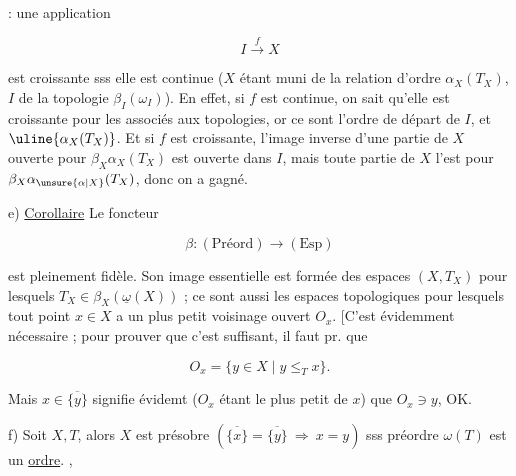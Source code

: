 : une application

\[
I\xrightarrow{f}X
\]

est croissante sss elle est continue (\unsure{$[$}$X$ étant muni de la
relation d'ordre $\alpha_X(T_X)$, $I$ de la topologie $\beta_I(\omega_I)$).
En effet, si $f$ est continue, on sait qu'elle est croissante pour les
 associés aux topologies, or ce sont l'ordre de départ de $I$, et $\uline{\alpha_X(T_X)}$.
Et si $f$ est croissante,  l'image inverse d'une partie de $X$
ouverte pour $\beta_X\alpha_X(T_X)$ est ouverte dans $I$, mais toute partie
 de $X$  l'est pour $\beta_X\alpha_{\unsure{\alpha|X}}(T_X)$, donc on a gagné.

e) \uline{Corollaire} Le foncteur

\[
\beta:(\mathrm{Préord})\longrightarrow(\mathrm{Esp})
\]

est pleinement fidèle. Son image essentielle est formée des
espaces $(X,T_X)$ pour lesquels $T_X\in\beta_X(\underline\omega(X))$ ; ce sont aussi
les espaces topologiques pour lesquels tout point $x\in X$ a un
plus petit voisinage ouvert $O_x$. [C'est évidemment nécessaire ;
 pour prouver que c'est suffisant, il faut pr. que

\[
O_x=\{y\in X\mid y\leq_T x\}.
\]

Mais  
$x\in\overline{\{y\}}$ signifie évidemt ($O_x$ étant le plus petit  de $x$)
que $O_x\ni y$, OK.


f) Soit  $X,T$, alors $X$ est présobre $(\overline{\{x\}}=\overline{\{y\}}\ \Rightarrow\ x=y)$
 sss  préordre $\omega(T)$ est un \uline{ordre}. ,


